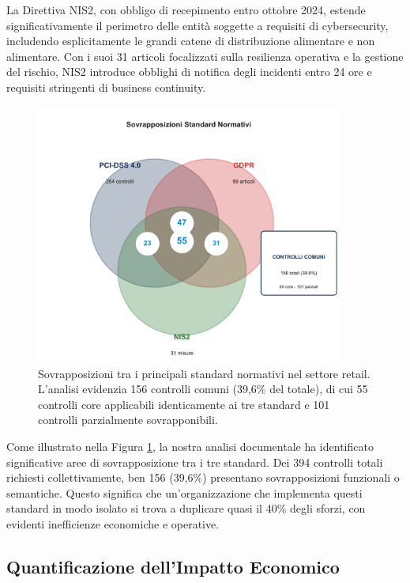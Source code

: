 La Direttiva NIS2, con obbligo di recepimento entro ottobre 2024, estende significativamente il perimetro delle entità soggette a requisiti di cybersecurity, includendo esplicitamente le grandi catene di distribuzione alimentare e non alimentare\autocite{eunis2directive}. Con i suoi 31 articoli focalizzati sulla resilienza operativa e la gestione del rischio, NIS2 introduce obblighi di notifica degli incidenti entro 24 ore e requisiti stringenti di business continuity.

\begin{figure}[h]
\centering
\includegraphics[width=0.9\textwidth]{thesis_figures/cap4/figura_4_1_venn_LARGE.pdf}
\caption{Sovrapposizioni tra i principali standard normativi nel settore retail. L'analisi evidenzia 156 controlli comuni (39,6\% del totale), di cui 55 controlli core applicabili identicamente ai tre standard e 101 controlli parzialmente sovrapponibili.}
\label{fig:venn_overlap}
\end{figure}

Come illustrato nella Figura \ref{fig:venn_overlap}, la nostra analisi documentale ha identificato significative aree di sovrapposizione tra i tre standard. Dei 394 controlli totali richiesti collettivamente, ben 156 (39,6\%) presentano sovrapposizioni funzionali o semantiche. Questo significa che un'organizzazione che implementa questi standard in modo isolato si trova a duplicare quasi il 40\% degli sforzi, con evidenti inefficienze economiche e operative.

\subsection{\texorpdfstring{Quantificazione dell'Impatto Economico}{4.2.2 - Quantificazione dell'Impatto Economico}}
\label{subsec:4.2.2_impatto}

